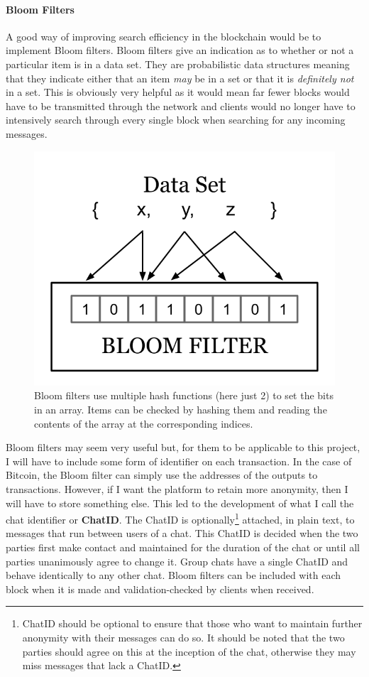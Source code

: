 \documentclass{article}
\begin{document}
\paragraph{Bloom Filters}
A good way of improving search efficiency in the blockchain would be to implement Bloom filters. Bloom filters give an indication as to whether or not a particular item is in a data set. They are probabilistic data structures meaning that they indicate either that an item \textit{may} be in a set or that it is \textit{definitely not} in a set. This is obviously very helpful as it would mean far fewer blocks would have to be transmitted through the network and clients would no longer have to intensively search through every single block when searching for any incoming messages.
\begin{figure}[h]
    \centering
    \includegraphics[width=0.5\linewidth]{Images/Diagrams/bloom_filters.png}
    \caption{Bloom filters use multiple hash functions (here just 2) to set the bits in an array. Items can be checked by hashing them and reading the contents of the array at the corresponding indices.}
    \label{fig:segwit}
\end{figure}

Bloom filters may seem very useful but, for them to be applicable to this project, I will have to include some form of identifier on each transaction. In the case of Bitcoin, the Bloom filter can simply use the addresses of the outputs to transactions. However, if I want the platform to retain more anonymity, then I will have to store something else.
This led to the development of what I call the chat identifier or \textbf{ChatID}. The ChatID is optionally\footnote{ChatID should be optional to ensure that those who want to maintain further anonymity with their messages can do so. It should be noted that the two parties should agree on this at the inception of the chat, otherwise they may miss messages that lack a ChatID.} attached, in plain text, to messages that run between users of a chat. This ChatID is decided when the two parties first make contact and maintained for the duration of the chat or until all parties unanimously agree to change it. Group chats have a single ChatID and behave identically to any other chat. Bloom filters can be included with each block when it is made and validation-checked by clients when received.
\end{document}
